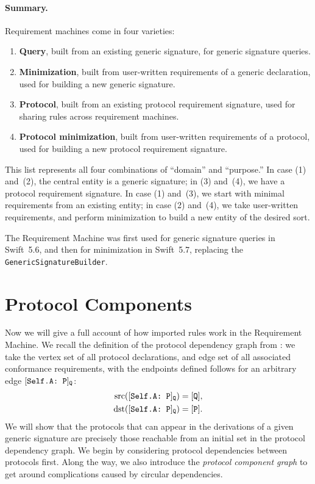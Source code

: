 \documentclass[../generics]{subfiles}
\begin{document}
\paragraph{Summary.}
Requirement machines come in four varieties:
\begin{enumerate}
\item \textbf{Query}, built from an existing generic signature, for generic signature queries.
\item \textbf{Minimization}, built from user-written requirements of a generic declaration, used for building a new generic signature.
\item \textbf{Protocol}, built from an existing protocol requirement signature, used for sharing rules across requirement machines.
\item \textbf{Protocol minimization}, built from user-written requirements of a protocol, used for building a new protocol requirement signature.
\end{enumerate}

This list represents all four combinations of ``domain'' and ``purpose.'' In case (1) and~(2), the central entity is a generic signature; in (3) and~(4), we have a protocol requirement signature. In case (1) and~(3), we start with minimal requirements from an existing entity; in case (2) and~(4), we take user-written requirements, and perform minimization to build a new entity of the desired sort.

The Requirement Machine was first used for generic signature queries in Swift~5.6, and then for minimization in Swift~5.7, replacing the \texttt{GenericSignatureBuilder}.

\section{Protocol Components}\label{protocol component}

Now we will give a full account of how imported rules work in the Requirement Machine. We recall the definition of the protocol dependency graph from : we take the vertex set of all protocol declarations, and edge set of all associated conformance requirements, with the endpoints defined follows for an arbitrary edge $[\texttt{Self.A:~P}]_\texttt{Q}$:
\begin{align*}
\operatorname{src}([\texttt{Self.A:~P}]_\texttt{Q})&=[\texttt{Q}],\\
\operatorname{dst}([\texttt{Self.A:~P}]_\texttt{Q})&=[\texttt{P}].
\end{align*}
We will show that the protocols that can appear in the derivations of a given generic signature are precisely those reachable from an initial set in the protocol dependency graph. We begin by considering protocol dependencies between protocols first. Along the way, we also introduce the \emph{protocol component graph} to get around complications caused by circular dependencies.
\end{document}
